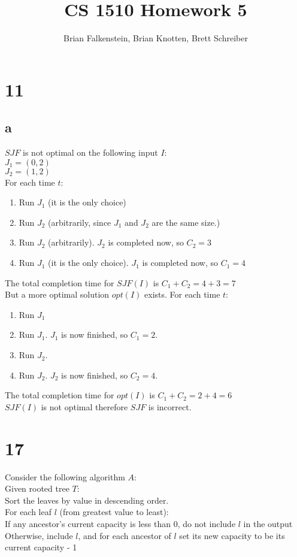 \documentclass[letterpaper,notitlepage,twoside]{article}
\title{CS 1510 Homework 5}
\author{Brian Falkenstein, Brian Knotten, Brett Schreiber}
\newcommand\tab[1][1cm]{\hspace*{#1}} %
\begin{document}
\maketitle

\section*{11}
\subsection*{a}
$SJF$ is not optimal on the following input $I$:\\
$J_1 = (0, 2)$\\
$J_2 = (1, 2)$\\
For each time $t$:
\begin{enumerate}
\item Run $J_1$ (it is the only choice)
\item Run $J_2$ (arbitrarily, since $J_1$ and $J_2$ are the same size.)
\item Run $J_2$ (arbitrarily). $J_2$ is completed now, so $C_2 = 3$
\item Run $J_1$ (it is the only choice). $J_1$ is completed now, so $C_1 = 4$
\end{enumerate}
The total completion time for $SJF(I)$ is $C_1 + C_2 = 4 + 3 = 7$\\
But a more optimal solution $opt(I)$ exists. For each time $t$:
\begin{enumerate}
\item Run $J_1$
\item Run $J_1$. $J_1$ is now finished, so $C_1 = 2$.
\item Run $J_2$.
\item Run $J_2$. $J_2$ is now finished, so $C_2 = 4$.
\end{enumerate}
The total completion time for $opt(I)$ is $C_1 + C_2 = 2 + 4 = 6$\\
$SJF(I)$ is not optimal therefore $SJF$ is incorrect.

\section*{17}
Consider the following algorithm $A$:\\
Given rooted tree $T$:\\
\tab Sort the leaves by value in descending order.\\
\tab For each leaf $l$ (from greatest value to least): \\ 
\tab\tab If any ancestor's current capacity is less than 0, do not include $l$ in the output \\
\tab\tab Otherwise, include $l$, and for each ancestor of $l$ set its new capacity to be its current capacity - 1 \\
\end{document}
